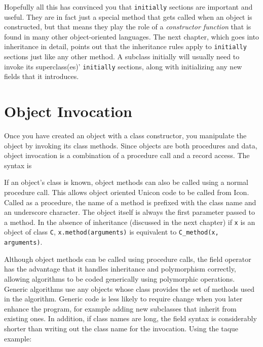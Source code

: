 
Hopefully all this has convinced you that \texttt{initially} sections
are important and useful. They are in fact just a special method that
gets called when an object is constructed, but that means they play
the role of a {\em constructor function\/} that is found in many
other object-oriented languages. The next chapter, which goes into
inheritance in detail, points out that the inheritance rules apply
to \texttt{initially} sections just like any other method.  A subclass
initially will usually need to invoke its superclass(es)'
\texttt{initially}
sections, along with initializing any new fields that it introduces.

\section{Object Invocation}

Once you have created an object with a class constructor, you manipulate
the object by invoking its class methods. Since objects are
both procedures and data, object invocation is a combination of a procedure call and a record
access. The syntax is


If an object's class is known, object methods can also
be called using a normal procedure call. This allows object oriented
Unicon code to be called from Icon. Called as a procedure, the name of
a method is prefixed with the class name and an underscore character.
The object itself is always the first parameter passed to a method. In
the absence of inheritance (discussed in the next chapter) if
\texttt{x} is an object of class \texttt{C},
\texttt{x.method(arguments)} is equivalent to \texttt{C\_method(x,
arguments)}.

Although object methods can be called using procedure calls, the field
operator has the advantage that it handles inheritance and polymorphism
correctly, allowing algorithms to be coded generically using
polymorphic operations. Generic algorithms use any objects whose class
provides the set of methods used in the algorithm. Generic code is less
likely to require change when you later enhance the program, for
example adding new subclasses that inherit from
existing ones. In addition, if class names are long, the field syntax
is considerably shorter than writing out the class name for the
invocation. Using the taque example:

